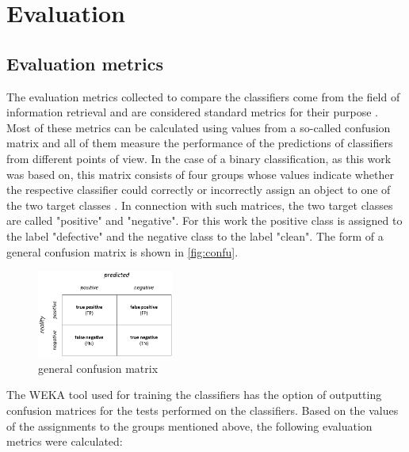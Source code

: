 
\section{Evaluation}

\subsection{Evaluation metrics}

The evaluation metrics collected to compare the classifiers come from the field of information retrieval and are considered standard metrics for their purpose \cite{Sammut2017}. Most of these metrics can be calculated using values from a so-called confusion matrix and all of them measure the performance of the predictions of classifiers from different points of view. In the case of a binary classification, as this work was based on, this matrix consists of four groups whose values indicate whether the respective classifier could correctly or incorrectly assign an object to one of the two target classes \cite{Sammut2017}. In connection with such matrices, the two target classes are called "positive" and "negative". For this work the positive class is assigned to the label "defective" and the negative class to the label "clean". The form of a general confusion matrix is shown in \autoref{fig:confu}.

\begin{figure}[H]
    \centering
    \includegraphics[width=0.4\textwidth]{Confusion}
    \caption{general confusion matrix\label{fig:confu}}
\end{figure}

The WEKA tool used for training the classifiers has the option of outputting confusion matrices for the tests performed on the classifiers. Based on the values of the assignments to the groups mentioned above, the following evaluation metrics were calculated:


